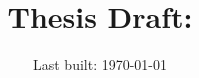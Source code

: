 \title{Thesis Draft: \thesistitle}
\author{\thesisauthor}
\date{Last built: \today}
\maketitle

\begin{singlespace}
\tableofcontents
\end{singlespace}
